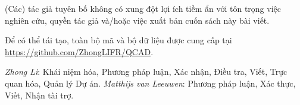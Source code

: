  (Các) tác giả tuyên bố không có xung đột lợi ích tiềm ẩn với
tôn trọng việc nghiên cứu, quyền tác giả và/hoặc việc xuất bản cuốn sách này
bài viết.

Để có thể tái tạo, toàn bộ mã và bộ dữ liệu được cung cấp tại \url{https://github.com/ZhongLIFR/QCAD}.


\textit{Zhong Li}: Khái niệm hóa, Phương pháp luận, Xác nhận, Điều tra, Viết, Trực quan hóa, Quản lý Dự án. \textit{Matthijs van Leeuwen}: Phương pháp luận, Xác thực, Viết, Nhận tài trợ.




\appendix
